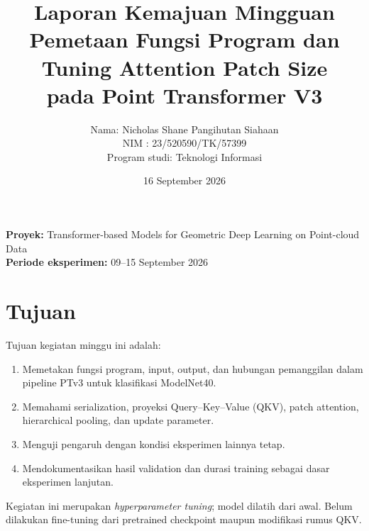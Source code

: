 \documentclass[11pt,a4paper]{article}
\title{Laporan Kemajuan Mingguan\\
 Pemetaan Fungsi Program dan Tuning Attention Patch Size\\
 pada Point Transformer V3}
\author{Nama: Nicholas Shane Pangihutan Siahaan\\
 NIM : 23/520590/TK/57399\\
 Program studi: Teknologi Informasi}
\date{16 September 2026}
\newcommand{\kode}[1]{\texttt{\detokenize{#1}}}
\begin{document}
\maketitle
\begin{center}
\textbf{Proyek:} Transformer-based Models for Geometric Deep Learning
on Point-cloud Data\\
\textbf{Periode eksperimen:} 09--15 September 2026
\end{center}


\section{Tujuan}
Tujuan kegiatan minggu ini adalah:
\begin{enumerate}
\item Memetakan fungsi program, input, output, dan hubungan pemanggilan
      dalam pipeline PTv3 untuk klasifikasi ModelNet40.
\item Memahami serialization, proyeksi Query--Key--Value (QKV), patch
      attention, hierarchical pooling, dan update parameter.
\item Menguji pengaruh \kode{enc_patch_size} dengan kondisi eksperimen
      lainnya tetap.
\item Mendokumentasikan hasil validation dan durasi training sebagai
      dasar eksperimen lanjutan.
\end{enumerate}
Kegiatan ini merupakan \textit{hyperparameter tuning}; model dilatih
dari awal. Belum dilakukan fine-tuning dari pretrained checkpoint maupun
modifikasi rumus QKV.
\end{document}
